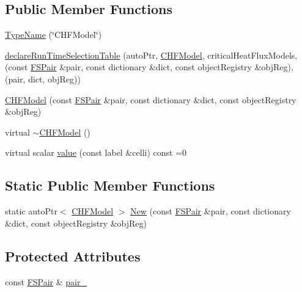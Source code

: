 \subsection*{Public Member Functions}
\begin{DoxyCompactItemize}
\item 
\hyperlink{classFoam_1_1CHFModel_aa49046c9b86095b96a3e417fa7dd2bd1}{Type\+Name} (\char`\"{}C\+H\+F\+Model\char`\"{})
\item 
\hyperlink{classFoam_1_1CHFModel_a53ab8dec0f497286b9ae27f8961dd246}{declare\+Run\+Time\+Selection\+Table} (auto\+Ptr, \hyperlink{classFoam_1_1CHFModel}{C\+H\+F\+Model}, critical\+Heat\+Flux\+Models,(const \hyperlink{classFoam_1_1FSPair}{F\+S\+Pair} \&pair, const dictionary \&dict, const object\+Registry \&obj\+Reg),(pair, dict, obj\+Reg))
\item 
\hyperlink{classFoam_1_1CHFModel_a4393f152a32ddfec3ddc080f0690c88c}{C\+H\+F\+Model} (const \hyperlink{classFoam_1_1FSPair}{F\+S\+Pair} \&pair, const dictionary \&dict, const object\+Registry \&obj\+Reg)
\item 
virtual \hyperlink{classFoam_1_1CHFModel_ab2604ed86f953b2ac6c2d6ec3c62823a}{$\sim$\+C\+H\+F\+Model} ()
\item 
virtual scalar \hyperlink{classFoam_1_1CHFModel_a139457cae4c5e04785e143fd8b9ed092}{value} (const label \&celli) const =0
\end{DoxyCompactItemize}
\subsection*{Static Public Member Functions}
\begin{DoxyCompactItemize}
\item 
static auto\+Ptr$<$ \hyperlink{classFoam_1_1CHFModel}{C\+H\+F\+Model} $>$ \hyperlink{classFoam_1_1CHFModel_a7e263170f97b07d12b6c4669e7222647}{New} (const \hyperlink{classFoam_1_1FSPair}{F\+S\+Pair} \&pair, const dictionary \&dict, const object\+Registry \&obj\+Reg)
\end{DoxyCompactItemize}
\subsection*{Protected Attributes}
\begin{DoxyCompactItemize}
\item 
const \hyperlink{classFoam_1_1FSPair}{F\+S\+Pair} \& \hyperlink{classFoam_1_1CHFModel_a587e19a1b4f4b498d2604d20c093a73b}{pair\+\_\+}
\end{DoxyCompactItemize}


